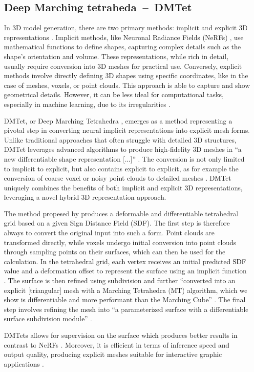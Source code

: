 \subsection{Deep Marching tetraheda~--~DMTet}\label{DMTet}

In 3D model generation, there are two primary methods: implicit and explicit 3D representations \citep{shen2021DMTet}. Implicit methods, like Neuronal Radiance Fields (NeRFs) \citep{mildenhallNERF}, use mathematical functions to define shapes, capturing complex details such as the shape's orientation and volume. These representations, while rich in detail, usually require conversion into 3D meshes for practical use. Conversely, explicit methods involve directly defining 3D shapes using specific coordinates, like in the case of meshes, voxels, or point clouds. This approach is able to capture and show geometrical details. However, it can be less ideal for computational tasks, especially in machine learning, due to its irregularities \citep{michalkiewicz2019deep}.

DMTet, or Deep Marching Tetrahedra \citep{shen2021DMTet}, emerges as a method representing a pivotal step in converting neural implicit representations into explicit mesh forms. Unlike traditional approaches that often struggle with detailed 3D structures, DMTet leverages advanced algorithms to produce high-fidelity 3D meshes in ``a new differentiable shape representation [\(\ldots\)]'' \citep{shen2021DMTet}. The conversion is not only limited to implicit to explicit, but also contains explicit to explicit, as for example the conversion of coarse voxel or noisy point clouds to detailed meshes \citep{shen2021DMTet}. DMTet uniquely combines the benefits of both implicit and explicit 3D representations, leveraging a novel hybrid 3D representation approach.

The method propesed by \citeauthor{shen2021DMTet} produces a deformable and differentiable tetrahedral grid based on a given Sign Distance Field (SDF). The first step is therefore always to convert the original input into such a form. Point clouds are transformed directly, while voxels undergo initial conversion into point clouds through sampling points on their surfaces, which can then be used for the calculation. In the tetrahedral grid, each vertex receives an initial predicted SDF value and a deformation offset to represent the surface using an implicit function \citep{shen2021DMTet}. The surface is then refined using subdivision and further ``converted into an explicit [triangular] mesh with a Marching Tetrahedra (MT) algorithm, which we show is differentiable and more performant than the Marching Cube'' \citep{shen2021DMTet}. The final step involves refining the mesh into ``a parameterized surface with a differentiable surface subdivision module'' \citep{shen2021DMTet}.

DMTets allows for supervision on the surface which produces better results in contrast to NeRFs \citep{shen2021DMTet}. Moreover, it is efficient in terms of inference speed and output quality, producing explicit meshes suitable for interactive graphic applications \citep{shen2021DMTet}.